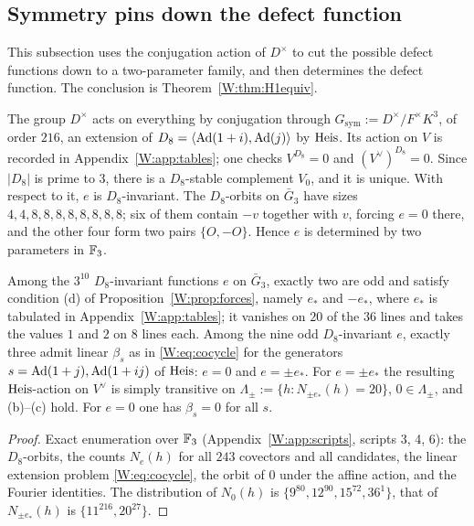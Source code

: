 \subsection{Symmetry pins down the defect function}
This subsection uses the conjugation action of $D^\times$ to cut the possible defect functions down to a two-parameter family, and then determines the defect function. The conclusion is Theorem~\ref{W:thm:H1equiv}.

The group $D^\times$ acts on everything by conjugation through
$G_{\mathrm{sym}}:=D^\times/F^\times K^3$, of order $216$, an extension of
$D_8=\langle\operatorname{Ad}(1+i),\operatorname{Ad}(j)\rangle$ by $\mathrm{Heis}$.  Its action on $V$ is
recorded in Appendix~\ref{W:app:tables}; one checks $V^{D_8}=0$ and
$(V^\vee)^{D_8}=0$.  Since $|D_8|$ is prime to $3$, there is a
$D_8$-stable complement $V_0$, and it is unique.  With respect to it,
$e$ is $D_8$-invariant.  The $D_8$-orbits on $\bar G_3$ have sizes
$4,4,8,8,8,8,8,8,8,8$; six of them contain $-v$ together with $v$,
forcing $e=0$ there, and the other four form two pairs $\{O,-O\}$.
Hence $e$ is determined by two parameters in $\mathbb F_3$.

\begin{proposition}\label{W:prop:design}
Among the $3^{10}$ $D_8$-invariant functions $e$ on $\bar G_3$,
exactly two are odd and satisfy condition (d) of
Proposition~\ref{W:prop:forces}, namely $e_*$ and $-e_*$, where $e_*$ is
tabulated in Appendix~\ref{W:app:tables}; it vanishes on $20$ of the $36$
lines and takes the values $1$ and $2$ on $8$ lines each.  Among the
nine odd $D_8$-invariant $e$, exactly three admit linear
$\beta_s$ as in \eqref{W:eq:cocycle} for the generators
$s=\operatorname{Ad}(1+j),\operatorname{Ad}(1+ij)$ of $\mathrm{Heis}$: $e=0$ and $e=\pm e_*$.  For
$e=\pm e_*$ the resulting $\mathrm{Heis}$-action on $V^\vee$ is simply
transitive on $\Lambda_{\pm}:=\{h:N_{\pm e_*}(h)=20\}$, $0\in\Lambda_\pm$,
and (b)--(c) hold.  For $e=0$ one has $\beta_s=0$ for all $s$.
\end{proposition}
\begin{proof}
Exact enumeration over $\mathbb F_3$ (Appendix~\ref{W:app:scripts}, scripts
3, 4, 6): the $D_8$-orbits, the counts $N_e(h)$ for all $243$ covectors
and all candidates, the linear extension problem \eqref{W:eq:cocycle},
the orbit of $0$ under the affine action, and the Fourier identities.
The distribution of $N_0(h)$ is $\{9^{80},12^{90},15^{72},36^{1}\}$,
that of $N_{\pm e_*}(h)$ is $\{11^{216},20^{27}\}$.
\end{proof}


